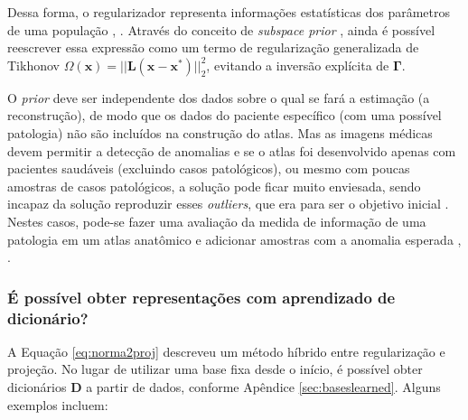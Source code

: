 Dessa forma, o regularizador representa informações estatísticas dos parâmetros de uma população \cite{Calvetti2018a}, \cite[pág. 70]{kaipio2005statistical}. Através do conceito de \textit{subspace prior} \cite[pág. 71]{kaipio2005statistical}, ainda é possível reescrever essa expressão como um termo de regularização generalizada de Tikhonov $\Omega(\mathbf{x}) = \vert \vert \mathbf{L} \left( \mathbf{x} - \mathbf{x}^* \right) \vert \vert^2_2 $, evitando a inversão explícita de $\bm{\Gamma}$. 

O \textit{prior} deve ser independente dos dados sobre o qual se fará a estimação (a reconstrução), de modo que os dados do paciente específico (com uma possível patologia) não são incluídos na construção do atlas. Mas as imagens médicas devem permitir a detecção de anomalias e se o atlas foi desenvolvido apenas com pacientes saudáveis (excluindo casos patológicos), ou mesmo com poucas amostras de casos patológicos, a solução pode ficar muito enviesada, sendo incapaz da solução reproduzir esses \textit{outliers}, que era para ser o objetivo inicial \cite{calvetti2007introduction}. Nestes casos, pode-se fazer uma avaliação da medida de informação de uma patologia em um atlas anatômico \cite{Nakanishi2020} e adicionar amostras com a anomalia esperada \cite{calvetti2007introduction}, \cite[pág. 223]{kaipio2005statistical}. 


\subsubsection{É possível obter representações com aprendizado de dicionário?}

A Equação \eqref{eq:norma2proj} descreveu um método híbrido entre regularização e projeção. No lugar de utilizar uma base fixa desde o início, é possível obter dicionários $\mathbf{D}$ a partir de dados, conforme Apêndice \ref{sec:baseslearned}. Alguns exemplos incluem:

